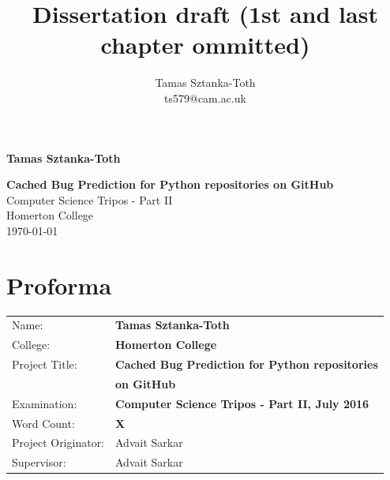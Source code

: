 \documentclass[12pt,twoside,notitlepage]{report}
\title{Dissertation draft (1st and last chapter ommitted)}
\author{Tamas Sztanka-Toth \\ ts579@cam.ac.uk}
\begin{document}
\setcounter{page}{1}
\pagestyle{plain}



\pagestyle{empty}

\hfill{\LARGE \bf Tamas Sztanka-Toth}

\vspace*{60mm}
\begin{center}
\Huge
{\bf Cached Bug Prediction for Python repositories on GitHub} \\
\vspace*{5mm}
Computer Science Tripos - Part II \\
\vspace*{5mm}
Homerton College \\
\vspace*{5mm}
\today  %
\end{center}

\cleardoublepage


\setcounter{page}{1}
\pagestyle{plain}

\chapter*{Proforma}

{\large
\begin{tabular}{ll}
Name:               & \bf Tamas Sztanka-Toth                       \\
College:            & \bf Homerton College                     \\
Project Title:      & \bf Cached Bug Prediction for Python repositories\\ 						& \bf on GitHub \\
Examination:        & \bf Computer Science Tripos - Part II, July 2016        \\
Word Count:         & \bf X\footnotemark[1]				 \\
Project Originator: & Advait Sarkar                \\
Supervisor:         & Advait Sarkar                    \\ 
\end{tabular}
}
\end{document}

